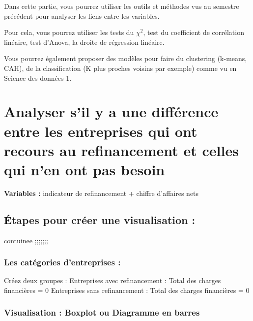 \documentclass[mstat,12pt]{unswthesis}
\begin{document}
Dans cette partie, vous pourrez utiliser les outils et méthodes vus au
semestre précédent pour analyser les liens entre les variables.

Pour cela, vous pourrez utiliser les tests du \(\chi^2\), test du
coefficient de corrélation linéaire, test d'Anova, la droite de
régression linéaire.

Vous pourrez également proposer des modèles pour faire du clustering
(k-means, CAH), de la classification (K plus proches voisins par
exemple) comme vu en Science des données 1.

\newpage

\section{\texorpdfstring{\textbf{Analyser s'il y a une différence entre
les entreprises qui ont recours au refinancement et celles qui n'en ont
pas
besoin}}{Analyser s'il y a une différence entre les entreprises qui ont recours au refinancement et celles qui n'en ont pas besoin}}\label{analyser-sil-y-a-une-diffuxe9rence-entre-les-entreprises-qui-ont-recours-au-refinancement-et-celles-qui-nen-ont-pas-besoin}

\bigskip

\textbf{Variables :} indicateur de refinancement + chiffre d'affaires
nets

\subsection{Étapes pour créer une visualisation
:}\label{uxe9tapes-pour-cruxe9er-une-visualisation-1}

contuinee ;;;;;;;

\subsubsection{Les catégories d'entreprises
:}\label{les-catuxe9gories-dentreprises-1}

\bigskip

Créez deux groupes : Entreprises avec refinancement : Total des charges
financières = 0 Entreprises sans refinancement : Total des charges
financières = 0

\subsubsection{Visualisation : Boxplot ou Diagramme en
barres}\label{visualisation-boxplot-ou-diagramme-en-barres-1}
\end{document}

